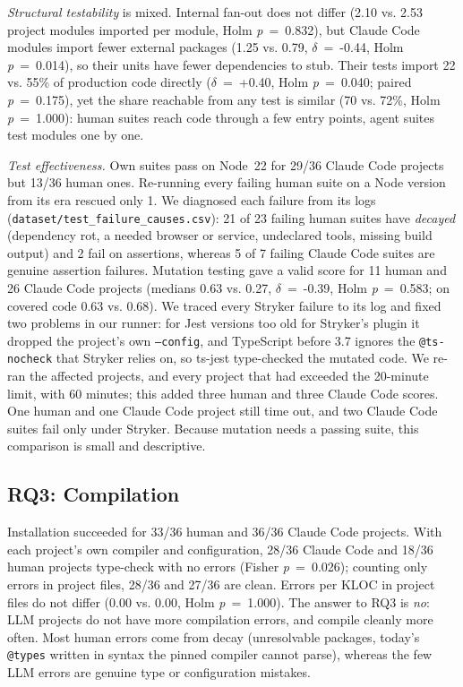 \documentclass[10pt,conference]{IEEEtran}
\begin{document}
\emph{Structural testability} is mixed. Internal fan-out does not differ (2.10 vs. 2.53 project modules imported per module, Holm \emph{p}~=~0.832), but Claude Code modules import fewer external packages (1.25 vs. 0.79, $\delta$~=~-0.44, Holm \emph{p}~=~0.014), so their units have fewer dependencies to stub. Their tests import 22 vs. 55\% of production code directly ($\delta$~=~+0.40, Holm \emph{p}~=~0.040; paired \emph{p}~=~0.175), yet the share reachable from any test is similar (70 vs. 72\%, Holm \emph{p}~=~1.000): human suites reach code through a few entry points, agent suites test modules one by one.

\emph{Test effectiveness.} Own suites pass on Node~22 for 29/36 Claude Code projects but 13/36 human ones. Re-running every failing human suite on a Node version from its era rescued only 1. We diagnosed each failure from its logs (\texttt{dataset/test\_failure\_causes.csv}): 21 of 23 failing human suites have \emph{decayed} (dependency rot, a needed browser or service, undeclared tools, missing build output) and 2 fail on assertions, whereas 5 of 7 failing Claude Code suites are genuine assertion failures. Mutation testing gave a valid score for 11 human and 26 Claude Code projects (medians 0.63 vs. 0.27, $\delta$~=~-0.39, Holm \emph{p}~=~0.583; on covered code 0.63 vs. 0.68). We traced every Stryker failure to its log and fixed two problems in our runner: for Jest versions too old for Stryker's plugin it dropped the project's own \texttt{--config}, and TypeScript before 3.7 ignores the \texttt{@ts-nocheck} that Stryker relies on, so ts-jest type-checked the mutated code. We re-ran the affected projects, and every project that had exceeded the 20-minute limit, with 60 minutes; this added three human and three Claude Code scores. One human and one Claude Code project still time out, and two Claude Code suites fail only under Stryker. Because mutation needs a passing suite, this comparison is small and descriptive.

\subsection{RQ3: Compilation}
Installation succeeded for 33/36 human and 36/36 Claude Code projects. With each project's own compiler and configuration, 28/36 Claude Code and 18/36 human projects type-check with no errors (Fisher \emph{p}~=~0.026); counting only errors in project files, 28/36 and 27/36 are clean. Errors per KLOC in project files do not differ (0.00 vs. 0.00, Holm \emph{p}~=~1.000). The answer to RQ3 is \emph{no}: LLM projects do not have more compilation errors, and compile cleanly more often. Most human errors come from decay (unresolvable packages, today's \texttt{@types} written in syntax the pinned compiler cannot parse), whereas the few LLM errors are genuine type or configuration mistakes.
\end{document}

